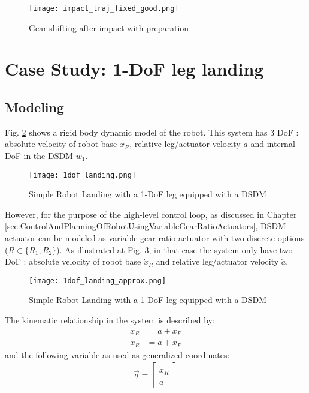 \begin{figure}[H]
	\centering
		\texttt{[image: impact\_traj\_fixed\_good.png]}
	\caption{Gear-shifting after impact with preparation}
	\label{fig:fixed_bad_impact}
\end{figure}




\section{Case Study: 1-DoF leg landing}

\subsection{Modeling}

Fig. \ref{fig:1dof_landing} shows a rigid body dynamic model of the robot. This system has 3 DoF : absolute velocity of robot base $\dot{x}_R$, relative leg/actuator velocity $\dot{a}$ and internal DoF in the DSDM $w_1$. 

\begin{figure}[htp]
	\centering
		\texttt{[image: 1dof\_landing.png]}
	\caption{Simple Robot Landing with a 1-DoF leg equipped with a DSDM}
	\label{fig:1dof_landing}
\end{figure}

However, for the purpose of the high-level control loop, as discussed in Chapter \ref{sec:ControlAndPlanningOfRobotUsingVariableGearRatioActuators}, DSDM actuator can be modeled as variable gear-ratio actuator with two discrete options ($R \in \{R_1,R_2\}$). As illustrated at Fig. \ref{fig:1dof_landing_approx}, in that case the system only have two DoF : absolute velocity of robot base $\dot{x}_R$ and relative leg/actuator velocity $\dot{a}$.

\begin{figure}[htp]
	\centering
		\texttt{[image: 1dof\_landing\_approx.png]}
	\caption{Simple Robot Landing with a 1-DoF leg equipped with a DSDM}
	\label{fig:1dof_landing_approx}
\end{figure}


The kinematic relationship in the system is described by:
%
\begin{align}
 x_R &= a + x_F \\
 \dot{x}_R &= \dot{a} + \dot{x}_F 
\end{align}
%
and the following variable as used as generalized coordinates:
%
\begin{align}
\dot{\vec{q}} = 
\left[ \begin{array}{c}
\dot{x}_R \\ \dot{a}
\end{array} \right] 
\end{align}


